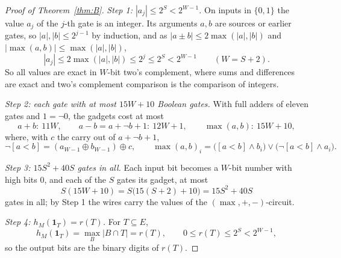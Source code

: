 \documentclass[11pt]{article}
\begin{document}
\begin{proof}[Proof of Theorem~\ref{thm:B}]
\emph{Step 1: $|a_j|\le2^{S}<2^{W-1}$.}  On inputs in $\{0,1\}$ the value $a_j$ of the $j$-th gate
is an integer.  Its arguments $a,b$ are sources or earlier gates, so
$|a|,|b|\le2^{j-1}$ by induction, and as $|a\pm b|\le2\max(|a|,|b|)$ and
$|\max(a,b)|\le\max(|a|,|b|)$,
\[
  |a_j|\le2\max(|a|,|b|)\le2^{j}\le2^{S}<2^{W-1}\qquad(W=S+2).
\]
So all values are exact in $W$-bit two's complement, where sums and differences
are exact and two's complement comparison is the comparison of integers.

\emph{Step 2: each gate with at most $15W+10$ Boolean gates.}  With full adders of eleven gates and $1=\neg0$, the
gadgets cost at most
\[
  a+b:\ 11W,\qquad a-b=a+\neg b+1:\ 12W+1,\qquad \max(a,b):\ 15W+10,
\]
where, with $c$ the carry out of $a+\neg b+1$,
\[
  \neg[a<b]=(a_{W-1}\oplus b_{W-1})\oplus c,\qquad
  \max(a,b)_i=\bigl([a<b]\wedge b_i\bigr)\vee\bigl(\neg[a<b]\wedge a_i\bigr).
\]

\emph{Step 3: $15S^{2}+40S$ gates in all.}  Each input bit becomes a $W$-bit number with high bits
$0$, and each of the $S$ gates its gadget, at most
\[
  S(15W+10)=S\bigl(15(S+2)+10\bigr)=15S^{2}+40S
\]
gates in all; by Step 1 the wires carry the values of the $(\max,+,-)$-circuit.

\emph{Step 4: $h_M(\mathbf 1_T)=r(T)$.}  For $T\subseteq E$,
\[
  h_M(\mathbf 1_T)=\max_{B}|B\cap T|=r(T),\qquad0\le r(T)\le2^{S}<2^{W-1},
\]
so the output bits are the binary digits of $r(T)$.
\end{proof}
\end{document}
